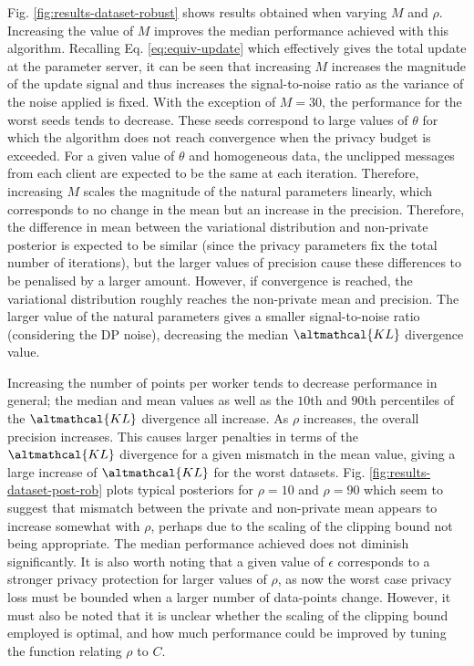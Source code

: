 Fig. \ref{fig:results-dataset-robust} shows results obtained when varying $M$ and $\rho$. Increasing the value of $M$ improves the median performance achieved with this algorithm. Recalling Eq. \eqref{eq:equiv-update} which effectively gives the total update at the parameter server, it can be seen that increasing $M$ increases the magnitude of the update signal and thus increases the signal-to-noise ratio as the variance of the noise applied is fixed. With the exception of $M=30$, the performance for the worst seeds tends to decrease. These seeds correspond to large values of $\theta$ for which the algorithm does not reach convergence when the privacy budget is exceeded. For a given value of $\theta$ and homogeneous data, the unclipped messages from each client are expected to be the same at each iteration. Therefore, increasing $M$ scales the magnitude of the natural parameters linearly, which corresponds to no change in the mean but an increase in the precision. Therefore, the difference in mean between the variational distribution and non-private posterior is expected to be similar (since the privacy parameters fix the total number of iterations), but the larger values of precision cause these differences to be penalised by a larger amount. However, if convergence is reached, the variational distribution roughly reaches the non-private mean and precision. The larger value of the natural parameters gives a smaller signal-to-noise ratio (considering the DP noise), decreasing the median $\altmathcal{KL}$ divergence value. 

Increasing the number of points per worker tends to decrease performance in general; the median and mean values as well as the $10$th and $90$th percentiles of the $\altmathcal{KL}$ divergence all increase. As $\rho$ increases, the overall precision increases. This causes larger penalties in terms of the $\altmathcal{KL}$ divergence for a given mismatch in the mean value, giving a large increase of $\altmathcal{KL}$ for the worst datasets. Fig. \ref{fig:results-dataset-post-rob} plots typical posteriors for $\rho=10$ and $\rho = 90$ which seem to suggest that mismatch between the private and non-private mean appears to increase somewhat with $\rho$, perhaps due to the scaling of the clipping bound not being appropriate. The median performance achieved does not diminish significantly. It is also worth noting that a given value of $\epsilon$ corresponds to a stronger privacy protection for larger values of $\rho$, as now the worst case privacy loss must be bounded when a larger number of data-points change. However, it must also be noted that it is unclear whether the scaling of the clipping bound employed is optimal, and how much performance could be improved by tuning the function relating $\rho$ to $C$.

